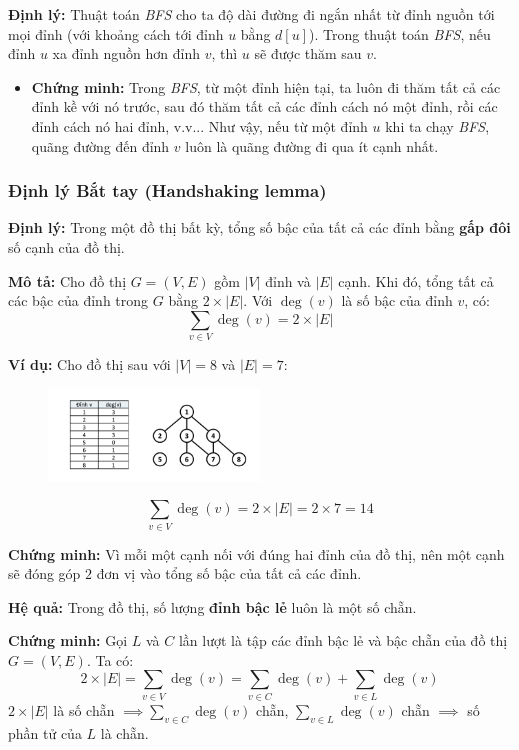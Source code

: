 \documentclass{article}
\begin{document}
\textbf{Định lý:} Thuật toán \textit{BFS} cho ta độ dài đường đi ngắn nhất từ đỉnh nguồn tới mọi đỉnh (với khoảng cách tới đỉnh $u$ bằng $d[u]$).  
Trong thuật toán \textit{BFS}, nếu đỉnh $u$ xa đỉnh nguồn hơn đỉnh $v$, thì $u$ sẽ được thăm sau $v$.

\begin{itemize}
    \item \textbf{Chứng minh:} Trong \textit{BFS}, từ một đỉnh hiện tại, ta luôn đi thăm tất cả các đỉnh kề với nó trước, sau đó thăm tất cả các đỉnh cách nó một đỉnh, rồi các đỉnh cách nó hai đỉnh, v.v... Như vậy, nếu từ một đỉnh $u$ khi ta chạy \textit{BFS}, quãng đường đến đỉnh $v$ luôn là quãng đường đi qua ít cạnh nhất.
\end{itemize}

\subsubsection{Định lý Bắt tay (Handshaking lemma)}

\textbf{Định lý:} Trong một đồ thị bất kỳ, tổng số bậc của tất cả các đỉnh bằng \textbf{gấp đôi} số cạnh của đồ thị.

\textbf{Mô tả:} Cho đồ thị $G = (V, E)$ gồm $|V|$ đỉnh và $|E|$ cạnh. Khi đó, tổng tất cả các bậc của đỉnh trong $G$ bằng $2 \times |E|$.  
Với $\deg(v)$ là số bậc của đỉnh $v$, có:
\[
\sum_{v \in V} \deg(v) = 2 \times |E|
\]

\textbf{Ví dụ:} Cho đồ thị sau với $|V| = 8$ và $|E| = 7$:

\begin{figure}[h]   
    \centering
    \includegraphics[width=0.5\textwidth]{img/b6/breadth-first-search_img5.png}
\end{figure}

\[
\sum_{v \in V} \deg(v) = 2 \times |E| = 2 \times 7 = 14
\]

\textbf{Chứng minh:}  
Vì mỗi một cạnh nối với đúng hai đỉnh của đồ thị, nên một cạnh sẽ đóng góp $2$ đơn vị vào tổng số bậc của tất cả các đỉnh.

\textbf{Hệ quả:} Trong đồ thị, số lượng \textbf{đỉnh bậc lẻ} luôn là một số chẵn.

\textbf{Chứng minh:} Gọi $L$ và $C$ lần lượt là tập các đỉnh bậc lẻ và bậc chẵn của đồ thị $G=(V,E)$. Ta có:
\[
2 \times |E| = \sum_{v \in V} \deg(v) = \sum_{v \in C} \deg(v) + \sum_{v \in L} \deg(v)
\]
$2 \times |E|$ là số chẵn $\implies \sum_{v \in C} \deg(v)$ chẵn, $\sum_{v \in L} \deg(v)$ chẵn $\implies$ số phần tử của $L$ là chẵn.
\end{document}
